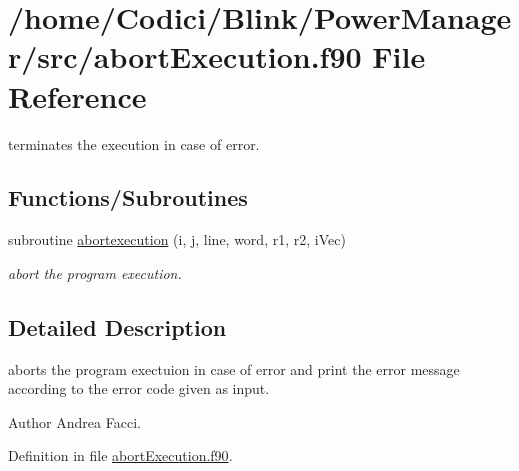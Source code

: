 \hypertarget{abort_execution_8f90}{\section{/home/\-Codici/\-Blink/\-Power\-Manager/src/abort\-Execution.f90 File Reference}
\label{abort_execution_8f90}
}


terminates the execution in case of error.  


\subsection*{Functions/\-Subroutines}
\begin{DoxyCompactItemize}
\item 
subroutine \hyperlink{abort_execution_8f90_af9fd9adc11792b7ac163e6d936be8995}{abortexecution} (i, j, line, word, r1, r2, i\-Vec)
\begin{DoxyCompactList}\small\item\em abort the program execution. \end{DoxyCompactList}\end{DoxyCompactItemize}


\subsection{Detailed Description}
\begin{DoxyVerb}aborts the program exectuion in case of error and print the error message
according to the error code given as input.
\end{DoxyVerb}
 \begin{DoxyAuthor}{Author}
Andrea Facci. 
\end{DoxyAuthor}


Definition in file \hyperlink{abort_execution_8f90_source}{abort\-Execution.\-f90}.



